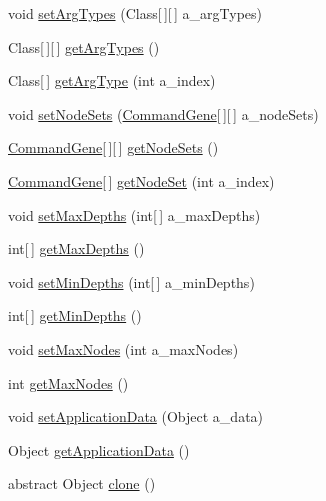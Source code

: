 \begin{DoxyCompactItemize}
void \hyperlink{classorg_1_1jgap_1_1gp_1_1_g_p_program_base_a96bb2d4a4a01e1456436112484562596}{set\-Arg\-Types} (Class\mbox{[}$\,$\mbox{]}\mbox{[}$\,$\mbox{]} a\-\_\-arg\-Types)
\item 
Class\mbox{[}$\,$\mbox{]}\mbox{[}$\,$\mbox{]} \hyperlink{classorg_1_1jgap_1_1gp_1_1_g_p_program_base_a62e928907e7e3d3b0779fc4a45652113}{get\-Arg\-Types} ()
\item 
Class\mbox{[}$\,$\mbox{]} \hyperlink{classorg_1_1jgap_1_1gp_1_1_g_p_program_base_aeb0088b0fb864f31801152fb9e47d78f}{get\-Arg\-Type} (int a\-\_\-index)
\item 
void \hyperlink{classorg_1_1jgap_1_1gp_1_1_g_p_program_base_abb9c0d33f365e1f3d788feb5604c01f3}{set\-Node\-Sets} (\hyperlink{classorg_1_1jgap_1_1gp_1_1_command_gene}{Command\-Gene}\mbox{[}$\,$\mbox{]}\mbox{[}$\,$\mbox{]} a\-\_\-node\-Sets)
\item 
\hyperlink{classorg_1_1jgap_1_1gp_1_1_command_gene}{Command\-Gene}\mbox{[}$\,$\mbox{]}\mbox{[}$\,$\mbox{]} \hyperlink{classorg_1_1jgap_1_1gp_1_1_g_p_program_base_aac3d24caa251da7607d7434fc6f70e78}{get\-Node\-Sets} ()
\item 
\hyperlink{classorg_1_1jgap_1_1gp_1_1_command_gene}{Command\-Gene}\mbox{[}$\,$\mbox{]} \hyperlink{classorg_1_1jgap_1_1gp_1_1_g_p_program_base_a0311c1615f3428bff589206c35595cc5}{get\-Node\-Set} (int a\-\_\-index)
\item 
void \hyperlink{classorg_1_1jgap_1_1gp_1_1_g_p_program_base_a15a610da6cf439e8a729a71d1b119b5a}{set\-Max\-Depths} (int\mbox{[}$\,$\mbox{]} a\-\_\-max\-Depths)
\item 
int\mbox{[}$\,$\mbox{]} \hyperlink{classorg_1_1jgap_1_1gp_1_1_g_p_program_base_aad377c53d502e373c13e94176b1d5662}{get\-Max\-Depths} ()
\item 
void \hyperlink{classorg_1_1jgap_1_1gp_1_1_g_p_program_base_a864e23f640d66d713e9ba2a74086c89d}{set\-Min\-Depths} (int\mbox{[}$\,$\mbox{]} a\-\_\-min\-Depths)
\item 
int\mbox{[}$\,$\mbox{]} \hyperlink{classorg_1_1jgap_1_1gp_1_1_g_p_program_base_ad3ea34d1fe09f263537df7c639814704}{get\-Min\-Depths} ()
\item 
void \hyperlink{classorg_1_1jgap_1_1gp_1_1_g_p_program_base_aae357dfed5c7e91ddddc3464b60dd665}{set\-Max\-Nodes} (int a\-\_\-max\-Nodes)
\item 
int \hyperlink{classorg_1_1jgap_1_1gp_1_1_g_p_program_base_aad0ae3c5c5e5a0c8b736ecc3aa063a4a}{get\-Max\-Nodes} ()
\item 
void \hyperlink{classorg_1_1jgap_1_1gp_1_1_g_p_program_base_ab2bf5f122cd2867c7dd8cb5b06815a0b}{set\-Application\-Data} (Object a\-\_\-data)
\item 
Object \hyperlink{classorg_1_1jgap_1_1gp_1_1_g_p_program_base_a2917af78464de7f0c7c6804bff8cb928}{get\-Application\-Data} ()
\item 
abstract Object \hyperlink{classorg_1_1jgap_1_1gp_1_1_g_p_program_base_aea99f931a9608a2a721c9ed00c2dcfe2}{clone} ()
\end{DoxyCompactItemize}
